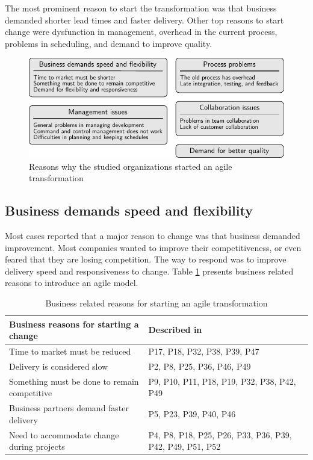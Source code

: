 The most prominent reason to start the transformation was that business demanded
shorter lead times and faster delivery. Other top reasons to start change were
dysfunction in management, overhead in the current process, problems in
scheduling, and demand to improve quality.


\begin{figure}[h]
  \begin{center}
    \includegraphics{graphics/reasonstochange_summary.pdf}
    \caption{Reasons why the studied organizations started an agile
             transformation}
    \label{fig:reasonstochange_summary}
  \end{center}
\end{figure}

\subsection{Business demands speed and flexibility}

Most cases reported that a major reason to change was that business demanded
improvement. Most companies wanted to improve their competitiveness, or even
feared that they are losing competition. The way to respond was to improve
delivery speed and responsiveness to change. Table
\ref{table:reasonstochange_business} presents business related reasons to
introduce an agile model.

\begin{table}
    \centering
    \begin{tabular}{ >{\raggedright\arraybackslash}p{}
                     >{\raggedright\arraybackslash}p{} }
        \toprule
        Business reasons for starting a change   &  Described in  \\
        \midrule
        Time to market must be reduced    &  P17, P18, P32, P38, P39, P47  \\
        Delivery is considered slow       &  P2, P8, P25, P36, P46, P49  \\
        Something must be done to remain competitive  &
                P9, P10, P11, P18, P19, P32, P38, P42, P49  \\
        Business partners demand faster delivery  &  P5, P23, P39, P40, P46  \\
        Need to accommodate change during projects  &
                P4, P8, P18, P25, P26, P33, P36, P39, P42, P49, P51, P52  \\
        \bottomrule
    \end{tabular}
    \caption{Business related reasons for starting an agile transformation}
    \label{table:reasonstochange_business}
\end{table}

